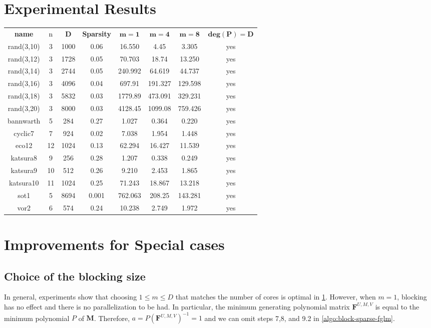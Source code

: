 \documentclass[12pt]{article}
\def\mF{\mathbf{F}}
\def\mM{\mathbf{M}}
\begin{document}
\section{Experimental Results}\label{section:ex}
\bgroup
\def\arraystretch{2}
\setlength\tabcolsep{10pt}
\begin{center}
\begin{tabular}{c|c|c|c|c|c|c|c}
	\textbf{name}& n& $\mathbf{D}$ & \textbf{Sparsity} & $\mathbf{m = 1}$ & $\mathbf{m = 4}$ & $\mathbf{m = 8}$ & $\mathbf{deg(P) = D}$\\
	\cline{1-8}
	rand(3,10)&3 & 1000& 0.06  & 16.550  & 4.45    & 3.305   & yes \\
	rand(3,12)&3 & 1728& 0.05  & 70.703  & 18.74   & 13.250  & yes \\
	rand(3,14)&3 & 2744& 0.05  & 240.992 & 64.619  & 44.737  & yes \\
	rand(3,16)&3 & 4096& 0.04  & 697.91  & 191.327 & 129.598 & yes \\
	rand(3,18)&3 & 5832& 0.03  & 1779.89 & 473.091 & 329.231 & yes \\
	rand(3,20)&3 & 8000& 0.03  & 4128.45 & 1099.08 & 759.426 & yes \\
	bannwarth &5 & 284 & 0.27  & 1.027   & 0.364   & 0.220   & yes \\
	cyclic7   &7 & 924 & 0.02  & 7.038   & 1.954   & 1.448   & yes \\
	eco12     &12& 1024& 0.13  & 62.294  & 16.427  & 11.539  & yes \\
	katsura8  &9 & 256 & 0.28  & 1.207   & 0.338   & 0.249   & yes \\
	katsura9  &10& 512 & 0.26  & 9.210   & 2.453   & 1.865   & yes \\
	katsura10 &11& 1024& 0.25  & 71.243  & 18.867  & 13.218  & yes \\
	sot1      &5 & 8694& 0.001 & 762.063 & 208.25  & 143.281 & yes \\
	vor2      &6 & 574 & 0.24   & 10.238  & 2.749   & 1.972   & yes 
\end{tabular}
\end{center}

\newpage
\section{Improvements for Special cases}
\subsection{Choice of the blocking size}
In general, experiments show that choosing $1 \le m \le D$ that matches
the number of cores is optimal in \cref{section:ex}. However,
when $m=1$, blocking has no effect and there is no parallelization
to be had. In particular, the minimum generating polynomial matrix
$\mF^{U,M,V}$ is equal to the minimum polynomial $P$ of $\mM$. Therefore,
$a = P (\mF^{U,M,V})^{-1} = 1$ and we can omit steps 7,8, and 9.2 in
\cref{algo:block-sparse-fglm}.
\end{document}
